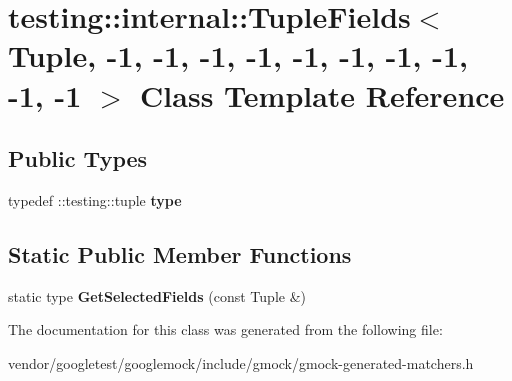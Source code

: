 \hypertarget{classtesting_1_1internal_1_1_tuple_fields_3_01_tuple_00_01-1_00_01-1_00_01-1_00_01-1_00_01-1_00_c541d4fe72f9dece2f1a50ee33bb16df}{}\section{testing\+:\+:internal\+:\+:Tuple\+Fields$<$ Tuple, -\/1, -\/1, -\/1, -\/1, -\/1, -\/1, -\/1, -\/1, -\/1, -\/1 $>$ Class Template Reference}
\label{classtesting_1_1internal_1_1_tuple_fields_3_01_tuple_00_01-1_00_01-1_00_01-1_00_01-1_00_01-1_00_c541d4fe72f9dece2f1a50ee33bb16df}
\subsection*{Public Types}
\begin{DoxyCompactItemize}
\item 
\mbox{\label{classtesting_1_1internal_1_1_tuple_fields_3_01_tuple_00_01-1_00_01-1_00_01-1_00_01-1_00_01-1_00_c541d4fe72f9dece2f1a50ee33bb16df_a853fa65a18c6b392327ae2cf59bc9571}} 
typedef \+::testing\+::tuple {\bfseries type}
\end{DoxyCompactItemize}
\subsection*{Static Public Member Functions}
\begin{DoxyCompactItemize}
\item 
\mbox{\label{classtesting_1_1internal_1_1_tuple_fields_3_01_tuple_00_01-1_00_01-1_00_01-1_00_01-1_00_01-1_00_c541d4fe72f9dece2f1a50ee33bb16df_a50c35eab642d04560d5a412cd10246ce}} 
static type {\bfseries Get\+Selected\+Fields} (const Tuple \&)
\end{DoxyCompactItemize}


The documentation for this class was generated from the following file\+:\begin{DoxyCompactItemize}
\item 
vendor/googletest/googlemock/include/gmock/gmock-\/generated-\/matchers.\+h\end{DoxyCompactItemize}
